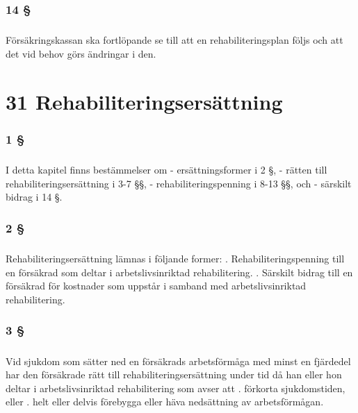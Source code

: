 \documentclass[a4paper,notitlepage,openany,10pt]{book}
\begin{document}
\subsection*{14 §}
\paragraph*{}
Försäkringskassan ska fortlöpande se till att en rehabiliteringsplan följs och att det vid behov görs ändringar i den.
\chapter*{31 Rehabiliteringsersättning}
\subsection*{1 §}
\paragraph*{}
I detta kapitel finns bestämmelser om
\newline - ersättningsformer i 2 §,
\newline - rätten till rehabiliteringsersättning i 3-7 §§,
\newline - rehabiliteringspenning i 8-13 §§, och
\newline - särskilt bidrag i 14 §.
\subsection*{2 §}
\paragraph*{}
Rehabiliteringsersättning lämnas i följande former:
. Rehabiliteringspenning till en försäkrad som deltar i arbetslivsinriktad rehabilitering.
. Särskilt bidrag till en försäkrad för kostnader som uppstår i samband med arbetslivsinriktad rehabilitering.
\subsection*{3 §}
\paragraph*{}
Vid sjukdom som sätter ned en försäkrads arbetsförmåga med minst en fjärdedel har den försäkrade rätt till rehabiliteringsersättning under tid då han eller hon deltar i arbetslivsinriktad rehabilitering som avser att
. förkorta sjukdomstiden, eller
. helt eller delvis förebygga eller häva nedsättning av arbetsförmågan.
\end{document}
